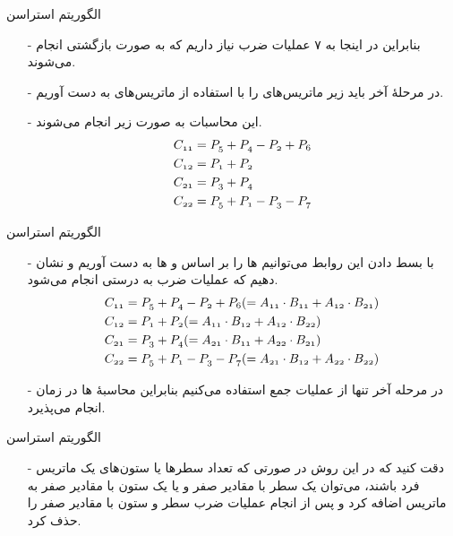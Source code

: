 \begin{frame}{‌الگوریتم استراسن}
\begin{itemize}\itemr
\item[-]
بنابراین در اینجا به ۷ عملیات ضرب نیاز داریم که به صورت بازگشتی انجام می‌شوند.
\item[-]
در مرحلهٔ آخر باید زیر ماتریس‌های 
 را با استفاده از ماتریس‌های 
  به دست آوریم.
\item[-]
این محاسبات به صورت زیر انجام می‌شوند.
\begin{align*}
&\mathnormal{C_{11} = P_5 + P_4 - P_2 + P_6}\\
&\mathnormal{C_{12} = P_1 + P_2}\\
&\mathnormal{C_{21} = P_3 + P_4}\\
&\mathnormal{C_{22} = P_5 + P_1 - P_3 - P_7}
\end{align*}
\end{itemize}
\end{frame}


\begin{frame}{‌الگوریتم استراسن}
\begin{itemize}\itemr
\item[-]
با بسط دادن این روابط می‌توانیم
ها را بر اساس
و
ها به دست آوریم و نشان دهیم که عملیات ضرب به درستی انجام می‌شود.
\begin{align*}
&\mathnormal{C_{11} = P_5 + P_4 - P_2 + P_6 (= A_{11} \cdot B_{11} + A_{12} \cdot B_{21})}\\
&\mathnormal{C_{12} = P_1 + P_2 (= A_{11} \cdot B_{12} + A_{12} \cdot B_{22})}\\
&\mathnormal{C_{21} = P_3 + P_4 (= A_{21} \cdot B_{11} + A_{22} \cdot B_{21})}\\
&\mathnormal{C_{22} = P_5 + P_1 - P_3 - P_7 (= A_{21} \cdot B_{12} + A_{22} \cdot B_{22})}
\end{align*}
\item[-]
در مرحله آخر تنها از عملیات جمع استفاده می‌کنیم بنابراین محاسبهٔ
ها در زمان
انجام می‌پذیرد.
\end{itemize}
\end{frame}


\begin{frame}{‌الگوریتم استراسن}
\begin{itemize}\itemr
\item[-]
دقت کنید که در این روش
در صورتی که تعداد سطرها یا ستون‌های یک ماتریس فرد باشند، می‌توان یک سطر با مقادیر صفر و یا یک ستون با مقادیر صفر به ماتریس اضافه کرد و پس از انجام عملیات ضرب سطر و ستون با مقادیر صفر را حذف کرد.
\end{itemize}
\end{frame}